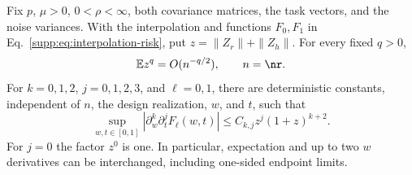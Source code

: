 \begin{lemma}\label{supp:lem:uniform-interpolation}
Fix $p$, $\mu>0$, $0<\rho<\infty$, both covariance matrices, the task vectors, and the noise variances. With the interpolation and functions $F_0,F_1$ in Eq.~\eqref{supp:eq:interpolation-risk}, put $z=\|Z_r\|+\|Z_h\|$. For every fixed $q>0$,
\begin{equation}
 \mathbb E z^q=O(n^{-q/2}),\qquad n=\nr.
 \label{supp:eq:gram-moment-bound}
\end{equation}
For $k=0,1,2$, $j=0,1,2,3$, and $\ell=0,1$, there are deterministic constants, independent of $n$, the design realization, $w$, and $t$, such that
\begin{equation}
 \sup_{w,t\in[0,1]}|\partial_w^k\partial_t^jF_\ell(w,t)|
 \le C_{k,j}z^j(1+z)^{k+2}.
 \label{supp:eq:mixed-derivative-envelope}
\end{equation}
For $j=0$ the factor $z^0$ is one. In particular, expectation and up to two $w$ derivatives can be interchanged, including one-sided endpoint limits.
\end{lemma}

